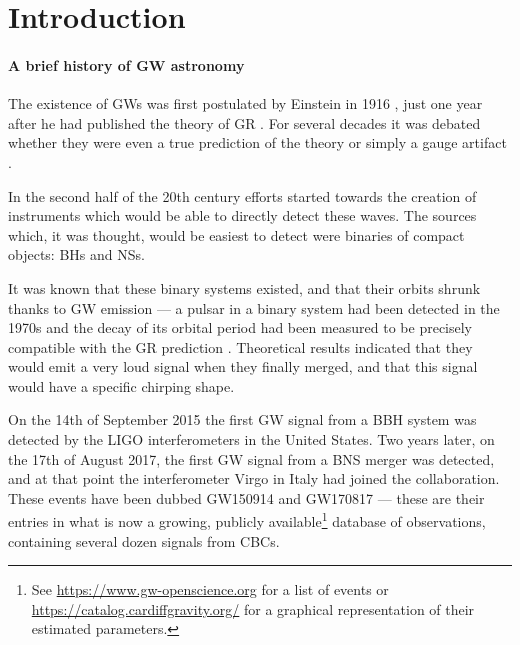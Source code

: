 \documentclass[main.tex]{subfiles}
\begin{document}
\newpage

\section*{Introduction}


\paragraph{A brief history of GW astronomy}

The existence of \acp{GW} was first postulated by Einstein in 1916 \cites{1916SPAW.......688E}{1918SPAW.......154E}, just one year after he had published the theory of \ac{GR} \cite[]{einsteinFeldgleichungenGravitation1915}. 
For several decades it was debated whether they were even a true prediction of the theory or simply a gauge artifact \cite{kennefickTravelingSpeedThought2007}. 

In the second half of the 20th century efforts started towards the creation of instruments which would be able to directly detect these waves. 
The sources which, it was thought, would be easiest to detect were binaries of compact objects: \acp{BH} and \acp{NS}.

It was known that these binary systems existed, and that their orbits shrunk thanks to \ac{GW} emission --- a pulsar in a binary system had been detected in the 1970s and the decay of its orbital period had been measured to be precisely compatible with the \ac{GR} prediction \cites{hulseDiscoveryPulsarBinary1975}{taylorNewTestGeneral1982}.
Theoretical results indicated that they would emit a very loud signal when they finally merged, and that this signal would have a specific chirping shape. 

On the 14th of September 2015 the first \ac{GW} signal from a \ac{BBH} system was detected \cite[]{ligoscientificcollaborationandvirgocollaborationObservationGravitationalWaves2016} by the \ac{LIGO} interferometers in the United States. 
Two years later, on the 17th of August 2017, the first \ac{GW} signal from a \ac{BNS} merger \cite{abbottGW170817ObservationGravitational2017}
was detected, and at that point the interferometer Virgo in Italy had joined the collaboration.
These events have been dubbed GW150914 and GW170817 --- these are their entries in what is now a growing, publicly available\footnote{See \url{https://www.gw-openscience.org} for a list of events or \url{https://catalog.cardiffgravity.org/} for a graphical representation of their estimated parameters.} database of observations, containing several dozen signals from \acp{CBC}.
\end{document}
